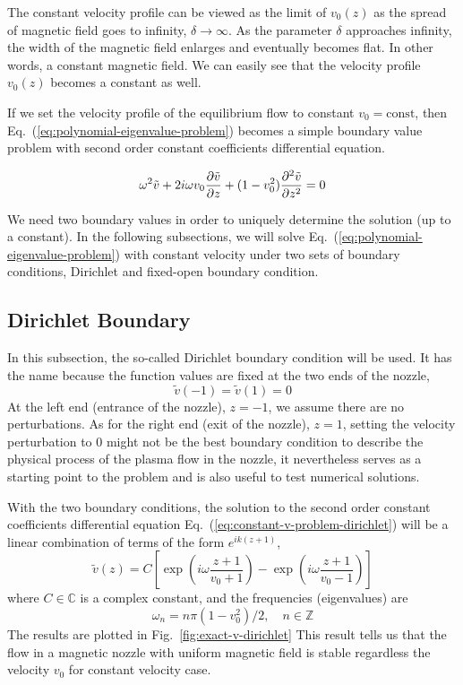The constant velocity profile can be viewed as the limit of $v_0(z)$ as the spread of magnetic field goes to infinity, $\delta\to\infty$. As the parameter $\delta$ approaches infinity, the width of the magnetic field enlarges and eventually becomes flat. In other words, a constant magnetic field. We can easily see that the velocity profile $v_0(z)$ becomes a constant as well.

If we set the velocity profile of the equilibrium flow to constant $v_0=\text{const}$, then Eq.~(\ref{eq:polynomial-eigenvalue-problem}) becomes a simple boundary value problem with second order constant coefficients differential equation.

\begin{equation} \label{eq:constant-v-problem-dirichlet}
	\omega^2\tilde{v} + 2i\omega v_0\pdv{\tilde{v}}{z} + (1-v_0^2)\pdv[2]{\tilde{v}}{z} = 0
\end{equation}

We need two boundary values in order to uniquely determine the solution (up to a constant). In the following subsections, we will solve Eq.~(\ref{eq:polynomial-eigenvalue-problem}) with constant velocity under two sets of boundary conditions, Dirichlet and fixed-open boundary condition.

\subsection{Dirichlet Boundary}
In this subsection, the so-called Dirichlet boundary condition will be used. It has the name because the function values are fixed at the two ends of the nozzle,
\begin{equation}
	\tilde{v}(-1) = \tilde{v}(1) = 0
\end{equation}
At the left end (entrance of the nozzle), $z=-1$, we assume there are no perturbations. As for the right end (exit of the nozzle), $z=1$, setting the velocity perturbation to 0 might not be the best boundary condition to describe the physical process of the plasma flow in the nozzle, it nevertheless serves as a starting point to the problem and is also useful to test numerical solutions.

With the two boundary conditions, the solution to the second order constant coefficients differential equation Eq.~(\ref{eq:constant-v-problem-dirichlet}) will be a linear combination of terms of the form $e^{ik(z+1)}$,
\begin{equation} \label{eq:constant-v-solution-dirichlet}
	\tilde{v}(z) = C\left[ \exp\left(i\omega\frac{z+1}{v_0+1}\right) - \exp\left(i\omega\frac{z+1}{v_0-1}\right) \right]
\end{equation}
where $C\in\mathbb{C}$ is a complex constant, and the frequencies (eigenvalues) are
\begin{equation}
	\omega_n = n\pi(1-v_0^2)/2,\quad n\in\mathbb{Z}
	\label{eq:eigvals-constant-v-dirichlet}
\end{equation}
The results are plotted in Fig.~\ref{fig:exact-v-dirichlet} This result tells us that the flow in a magnetic nozzle with uniform magnetic field is stable regardless the velocity $v_0$ for constant velocity case.

